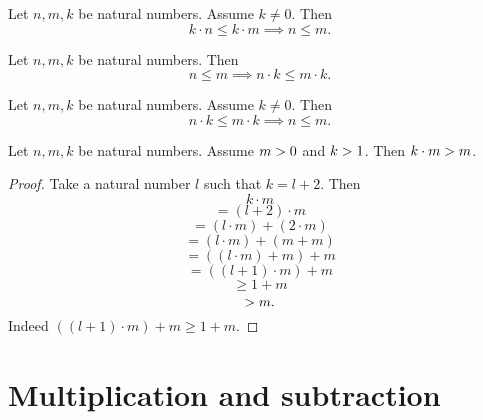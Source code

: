 \documentclass[../arithmetic.tex]{subfiles}
\begin{document}
  \begin{forthel}
    \begin{corollary}
      Let $n, m, k$ be natural numbers.
      Assume $k \neq 0$.
      Then \[ k \cdot n \leq k \cdot m \implies n \leq m. \]
    \end{corollary}
  \end{forthel}

  \begin{forthel}
    \begin{corollary}
      Let $n, m, k$ be natural numbers.
      Then \[ n \leq m \implies n \cdot k \leq m \cdot k. \]
    \end{corollary}
  \end{forthel}

  \begin{forthel}
    \begin{corollary}
      Let $n, m, k$ be natural numbers.
      Assume $k \neq 0$.
      Then \[ n \cdot k \leq m \cdot k \implies n \leq m. \]
    \end{corollary}
  \end{forthel}

  \begin{forthel}
    \begin{proposition}
      Let $n, m, k$ be natural numbers.
      Assume $m > 0$ and $k > 1$.
      Then $k \cdot m > m$.
    \end{proposition}
    \begin{proof}
      Take a natural number $l$ such that $k = l \plus 2$.
      Then
      \[  k \cdot m                       \]
      \[    = (l \plus 2) \cdot m             \]
      \[    = (l \cdot m) \plus (2 \cdot m)   \]
      \[    = (l \cdot m) \plus (m \plus m)       \]
      \[    = ((l \cdot m) \plus m) \plus m       \]
      \[    = ((l \plus 1) \cdot m) \plus m       \]
      \[    \geq 1 \plus m                    \]
      \[    > m.                          \]
      Indeed $((l \plus 1) \cdot m) \plus m \geq 1 \plus m$.
    \end{proof}
  \end{forthel}


  \section{Multiplication and subtraction}
\end{document}
